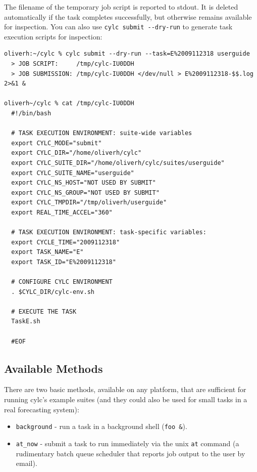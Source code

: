 \documentclass[11pt,a4paper]{article}
\begin{document}
The filename of the temporary job script is reported to
stdout. It is deleted automatically if the task completes successfully,
but otherwise remains available for inspection.  You can also use
\lstinline=cylc submit --dry-run= to generate task
execution scripts for inspection:


\begin{lstlisting}
oliverh:~/cylc % cylc submit --dry-run --task=E%2009112318 userguide
  > JOB SCRIPT:     /tmp/cylc-IU0DDH
  > JOB SUBMISSION: /tmp/cylc-IU0DDH </dev/null > E%2009112318-$$.log 2>&1 &
  
oliverh~/cylc % cat /tmp/cylc-IU0DDH
  #!/bin/bash
  
  # TASK EXECUTION ENVIRONMENT: suite-wide variables
  export CYLC_MODE="submit"
  export CYLC_DIR="/home/oliverh/cylc"
  export CYLC_SUITE_DIR="/home/oliverh/cylc/suites/userguide"
  export CYLC_SUITE_NAME="userguide"
  export CYLC_NS_HOST="NOT USED BY SUBMIT"
  export CYLC_NS_GROUP="NOT USED BY SUBMIT"
  export CYLC_TMPDIR="/tmp/oliverh/userguide"
  export REAL_TIME_ACCEL="360"
  
  # TASK EXECUTION ENVIRONMENT: task-specific variables:
  export CYCLE_TIME="2009112318"
  export TASK_NAME="E"
  export TASK_ID="E%2009112318"
  
  # CONFIGURE CYLC ENVIRONMENT
  . $CYLC_DIR/cylc-env.sh
  
  # EXECUTE THE TASK
  TaskE.sh 
  
  #EOF
\end{lstlisting}

\subsection{Available Methods}
\label{AvailableMethods}

\lstset{language=bash}

There are two basic methods, available on any platform, that are
sufficient for running cylc's example suites (and they could also be
used for small tasks in a real forecasting system): 

\begin{itemize}

    \item \lstinline=background= - run a task in a background shell
        (\lstinline=foo &=). 

     \item \lstinline=at_now= - submit a task to run immediately via the
         unix \lstinline=at= command (a rudimentary batch queue
         scheduler that reports job output to the user by email).

\end{itemize}
\end{document}
